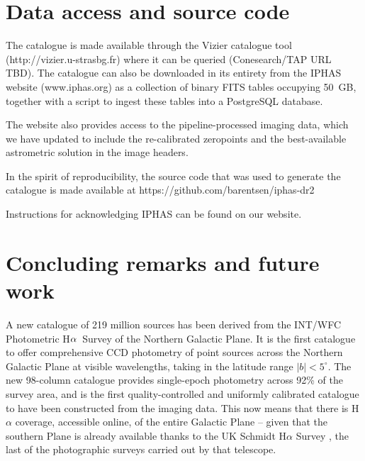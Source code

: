 \documentclass[useAMS,usenatbib]{mn2e}
\def\ha{\mbox{H$\rm \alpha$}}
\begin{document}
\section{Data access and source code}
\label{sec:dataaccess}

The catalogue is made available through the Vizier
catalogue tool (http://vizier.u-strasbg.fr)
where it can be queried
(Conesearch/TAP URL TBD).
The catalogue can also be downloaded in its entirety
from the IPHAS website (www.iphas.org) as a collection 
of binary FITS tables occupying 50~GB,
together with a script
to ingest these tables into a PostgreSQL database.

The website also provides access to the pipeline-processed
imaging data, which we have updated to include
the re-calibrated zeropoints and the best-available
astrometric solution in the image headers.

In the spirit of reproducibility,
the source code that was used to generate
the catalogue is made available at
https://github.com/barentsen/iphas-dr2

Instructions for acknowledging IPHAS can be found on our website.


\section{Concluding remarks and future work}
\label{sec:conclusions}

A new catalogue of 219 million sources has been
derived from the INT/WFC Photometric \ha\ Survey
of the Northern Galactic Plane.
It is the first catalogue to offer comprehensive CCD photometry
of point sources across the Northern Galactic Plane at visible wavelengths,
taking in the latitude range $|b|<5^\circ$.
The new 98-column catalogue provides single-epoch photometry
across 92\% of the survey area,
and is the first quality-controlled and uniformly calibrated
catalogue to have been constructed from the imaging data.  This
now means that there is H$\alpha$ coverage, accessible online,
of the entire Galactic Plane -- given that the 
southern Plane is already available thanks to the UK
Schmidt H$\alpha$ Survey \citep[SHS,][]{Parker2005}, the last of the 
photographic surveys carried out by that telescope.
\end{document}
